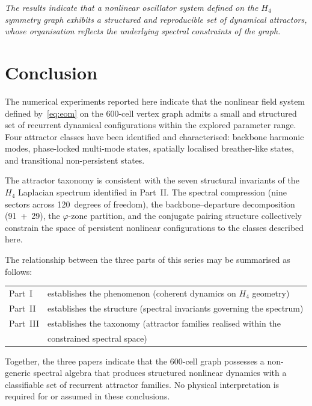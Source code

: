 \documentclass[12pt,a4paper]{article}
\newcommand{\Hfour}{H_4}
\newcommand{\vphi}{\varphi}
\begin{document}
\bigskip

\noindent\emph{The results indicate that a nonlinear oscillator system
defined on the $\Hfour$ symmetry graph exhibits a structured and
reproducible set of dynamical attractors, whose organisation reflects
the underlying spectral constraints of the graph.}


\section{Conclusion}\label{sec:conclusion}

The numerical experiments reported here indicate that the nonlinear
field system defined by~\eqref{eq:eom} on the 600-cell vertex graph
admits a small and structured set of recurrent dynamical
configurations within the explored parameter range.  Four attractor
classes have been identified and characterised: backbone harmonic
modes, phase-locked multi-mode states, spatially localised
breather-like states, and transitional non-persistent states.

The attractor taxonomy is consistent with the seven structural
invariants of the $\Hfour$ Laplacian spectrum identified in Part~II.
The spectral compression (nine sectors across 120~degrees of freedom),
the backbone--departure decomposition (91~+~29), the $\vphi$-zone
partition, and the conjugate pairing structure collectively constrain
the space of persistent nonlinear configurations to the classes
described here.

The relationship between the three parts of this series may be
summarised as follows:
\begin{center}
\begin{tabular}{@{}ll@{}}
Part~I & establishes the phenomenon (coherent dynamics on $\Hfour$ geometry) \\
Part~II & establishes the structure (spectral invariants governing the spectrum) \\
Part~III & establishes the taxonomy (attractor families realised within the \\
  & constrained spectral space) \\
\end{tabular}
\end{center}

Together, the three papers indicate that the 600-cell graph possesses
a non-generic spectral algebra that produces structured nonlinear
dynamics with a classifiable set of recurrent attractor families.  No
physical interpretation is required for or assumed in these
conclusions.
\end{document}
